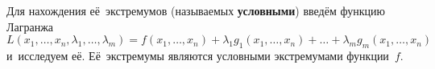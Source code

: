 Для нахождения её~экстремумов (называемых \textbf{условными}) введём функцию Лагранжа
\begin{equation*}
L(x_1, \ldots, x_n, \lambda_1, \ldots, \lambda_m) =
f(x_1, \ldots, x_n) + \lambda_1 g_1(x_1, \ldots, x_n) + \ldots + \lambda_m g_m(x_1, \ldots, x_n)
\end{equation*}
и~исследуем её.
Её~экстремумы являются условными экстремумами функции~$f$.